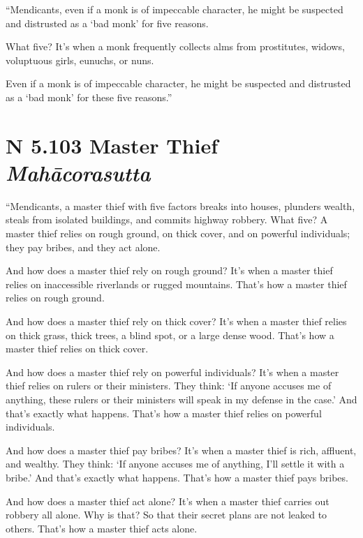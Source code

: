 \documentclass[12pt,openany]{book}%
\newcommand*{\suttatitleacronym}[1]{\smaller[2]{#1}\vspace*{.3em}}
\newcommand*{\suttatitletranslation}[1]{\linebreak{#1}}
\newcommand*{\suttatitleroot}[1]{\linebreak\smaller[2]\itshape{#1}}
\newcommand*{\tocacronym}[1]{\hspace*{-3.3em}{#1}\quad}
\newcommand*{\toctranslation}[1]{#1}
\newcommand*{\tocroot}[1]{(\textit{#1})}
\begin{document}
“Mendicants, even if a monk is of impeccable character, he might be suspected and distrusted as a ‘bad monk’ for five reasons. 

What five? It’s when a monk frequently collects alms from prostitutes, widows, voluptuous girls, eunuchs, or nuns. 

Even if a monk is of impeccable character, he might be suspected and distrusted as a ‘bad monk’ for these five reasons.” 

%
\section*{{\suttatitleacronym AN 5.103}{\suttatitletranslation A Master Thief }{\suttatitleroot Mahācorasutta}}
\addcontentsline{toc}{section}{\tocacronym{AN 5.103} \toctranslation{A Master Thief } \tocroot{Mahācorasutta}}

“Mendicants, a master thief with five factors breaks into houses, plunders wealth, steals from isolated buildings, and commits highway robbery. What five? A master thief relies on rough ground, on thick cover, and on powerful individuals; they pay bribes, and they act alone. 

And how does a master thief rely on rough ground? It’s when a master thief relies on inaccessible riverlands or rugged mountains. That’s how a master thief relies on rough ground. 

And how does a master thief rely on thick cover? It’s when a master thief relies on thick grass, thick trees, a blind spot, or a large dense wood. That’s how a master thief relies on thick cover. 

And how does a master thief rely on powerful individuals? It’s when a master thief relies on rulers or their ministers. They think: ‘If anyone accuses me of anything, these rulers or their ministers will speak in my defense in the case.’ And that’s exactly what happens. That’s how a master thief relies on powerful individuals. 

And how does a master thief pay bribes? It’s when a master thief is rich, affluent, and wealthy. They think: ‘If anyone accuses me of anything, I’ll settle it with a bribe.’ And that’s exactly what happens. That’s how a master thief pays bribes. 

And how does a master thief act alone? It’s when a master thief carries out robbery all alone. Why is that? So that their secret plans are not leaked to others. That’s how a master thief acts alone. 
\end{document}

